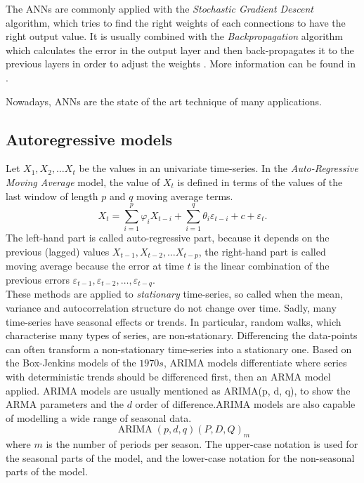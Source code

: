 \documentclass{sig-alternate-sigmod07}
\begin{document}
The ANNs are commonly applied with the \emph{Stochastic Gradient Descent} algorithm, which tries to find the right weights of each connections to have the right output value. It is usually combined with the \emph{Backpropagation} algorithm which calculates the error in the output layer and then back-propagates it to the previous layers in order to adjust the weights \cite{rumelhart1985learning}. More information can be found in \cite{bishop2006pattern}.

Nowadays, ANNs are the state of the art technique of many applications.


\subsection{Autoregressive models}
Let $X_1, X_2, \ldots X_t$ be the values in an univariate time-series. In the \emph{Auto-Regressive Moving Average} model, the value of $X_t$ is defined in terms of the values of the last window of length $p$ and $q$ moving average terms.
\begin{displaymath}X_t =  \sum_{i=1}^p \varphi_i X_{t-i} + \sum_{i=1}^q \theta_i \varepsilon_{t-i} + c + \varepsilon_t.\end{displaymath}
The left-hand part is called auto-regressive part, because it depends on the previous (lagged) values $X_{t-1}, X_{t-2}, \ldots X_{t-p}$, the right-hand part is called moving average because the error at time $t$ is the linear combination of the previous errors $\varepsilon_{t-1}, \varepsilon_{t-2}, \ldots, \varepsilon_{t-q}$. \\
These methods are applied to \emph{stationary} time-series, so called when the mean, variance and autocorrelation structure do not change over time. Sadly, many time-series have seasonal effects or trends. In particular, random walks,
which characterise many types of series, are non-stationary. Differencing the data-points can often transform a non-stationary time-series into a stationary one. Based on the Box-Jenkins models of the $1970s$, ARIMA models differentiate where series with deterministic trends should be differenced first, then an ARMA model applied. ARIMA models are usually mentioned as ARIMA(p, d, q), to show the ARMA parameters and the $d$ order of difference.ARIMA models are also capable of modelling a wide range of seasonal data. 
\begin{displaymath}
\operatorname{ARIMA}(p,d,q) (P,D,Q)_m
\end{displaymath}
where $m$ is the number of periods per season. The upper-case notation is used for the seasonal parts of the model, and the lower-case notation for the non-seasonal parts of the model.
\end{document}
